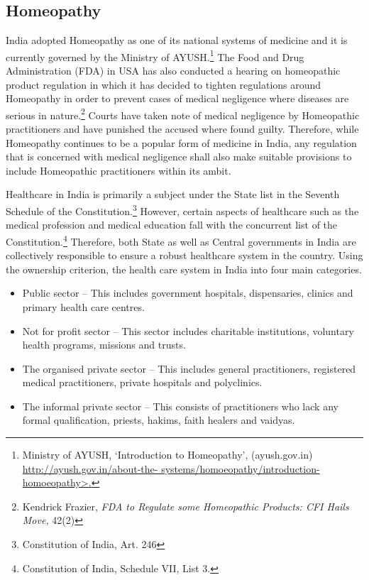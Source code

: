 \begin{multicols}{2}
\subsection*{Homeopathy}

\noi
India adopted Homeopathy as one of its national systems of medicine and it is currently governed by the Ministry of AYUSH.\footnote{Ministry of AYUSH, ‘Introduction to Homeopathy’, (ayush.gov.in) \url{http://ayush.gov.in/about-the- systems/homoeopathy/introduction-homoeopathy>.}} The Food and Drug Administration (FDA) in USA has also conducted a hearing on homeopathic product regulation in which it has decided to tighten regulations around Homeopathy in order to prevent cases of medical negligence where diseases are serious in nature.\footnote{Kendrick Frazier, \textit{FDA to Regulate some Homeopathic Products: CFI Hails Move,} 42(2)} Courts have taken note of medical negligence by Homeopathic practitioners and have punished the accused where found guilty. Therefore, while Homeopathy continues to be a popular form of medicine in India, any regulation that is concerned with medical negligence shall also make suitable provisions to include Homeopathic practitioners within its ambit.

\noi
Healthcare in India is primarily a subject under the State list in the Seventh Schedule of the Constitution.\footnote{Constitution of India, Art. 246} However, certain aspects of healthcare such as the medical profession and medical education fall with the concurrent list of the Constitution.\footnote{Constitution of India, Schedule VII, List 3.} Therefore, both State as well as Central governments in India are collectively responsible to ensure a robust healthcare system in the country. Using the ownership criterion, the health care system in India into four main categories.

\begin{itemize}
\item Public sector – This includes government hospitals, dispensaries, clinics and primary health care centres.

\item Not for profit sector – This sector includes charitable institutions, voluntary health programs, missions and trusts.

\item The organised private sector – This includes general practitioners, registered medical practitioners, private hospitals and polyclinics.

\item The informal private sector – This consists of practitioners who lack any formal qualification, priests, hakims, faith healers and vaidyas.
\end{itemize}


\end{multicols}
